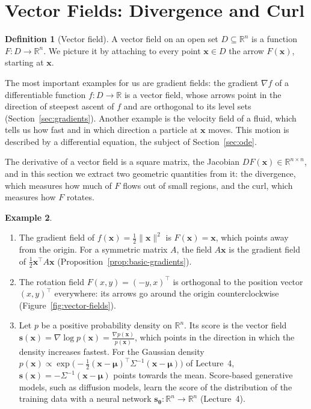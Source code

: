 \documentclass[11pt]{article}
\newcommand{\norm}[1]{\lVert #1 \rVert}
\theoremstyle{definition}
\newtheorem{definition}{Definition}[section]
\newtheorem{example}[definition]{Example}
\theoremstyle{plain}
\theoremstyle{remark}
\begin{document}
\section{Vector Fields: Divergence and Curl}\label{sec:vector-fields}

\begin{definition}[Vector field]\label{def:vector-field}
    A vector field on an open set $D \subseteq \mathbb{R}^n$ is a function $F: D \to \mathbb{R}^n$. We picture it by attaching to every point $\mathbf{x} \in D$ the arrow $F(\mathbf{x})$, starting at $\mathbf{x}$.
\end{definition}

The most important examples for us are gradient fields: the gradient $\nabla f$ of a differentiable function $f: D \to \mathbb{R}$ is a vector field, whose arrows point in the direction of steepest ascent of $f$ and are orthogonal to its level sets (Section~\ref{sec:gradients}). Another example is the velocity field of a fluid, which tells us how fast and in which direction a particle at $\mathbf{x}$ moves. This motion is described by a differential equation, the subject of Section~\ref{sec:ode}.

The derivative of a vector field is a square matrix, the Jacobian $DF(\mathbf{x}) \in \mathbb{R}^{n \times n}$, and in this section we extract two geometric quantities from it: the divergence, which measures how much of $F$ flows out of small regions, and the curl, which measures how $F$ rotates.

\begin{example}\label{ex:vector-fields}
    \begin{enumerate}
        \item The gradient field of $f(\mathbf{x}) = \frac{1}{2}\norm{\mathbf{x}}^2$ is $F(\mathbf{x}) = \mathbf{x}$, which points away from the origin. For a symmetric matrix $A$, the field $A\mathbf{x}$ is the gradient field of $\frac{1}{2}\mathbf{x}^\top A\mathbf{x}$ (Proposition~\ref{prop:basic-gradients}).
        \item The rotation field $F(x, y) = (-y, x)^\top$ is orthogonal to the position vector $(x, y)^\top$ everywhere: its arrows go around the origin counterclockwise (Figure~\ref{fig:vector-fields}).
        \item Let $p$ be a positive probability density on $\mathbb{R}^n$. Its score is the vector field $\mathbf{s}(\mathbf{x}) = \nabla\log p(\mathbf{x}) = \frac{\nabla p(\mathbf{x})}{p(\mathbf{x})}$, which points in the direction in which the density increases fastest. For the Gaussian density $p(\mathbf{x}) \propto \exp\big(-\frac{1}{2}(\mathbf{x} - \boldsymbol{\mu})^\top\Sigma^{-1}(\mathbf{x} - \boldsymbol{\mu})\big)$ of Lecture~4, $\mathbf{s}(\mathbf{x}) = -\Sigma^{-1}(\mathbf{x} - \boldsymbol{\mu})$ points towards the mean. Score-based generative models, such as diffusion models, learn the score of the distribution of the training data with a neural network $\mathbf{s}_{\boldsymbol{\theta}}: \mathbb{R}^n \to \mathbb{R}^n$ (Lecture~4).
    \end{enumerate}
\end{example}
\end{document}
